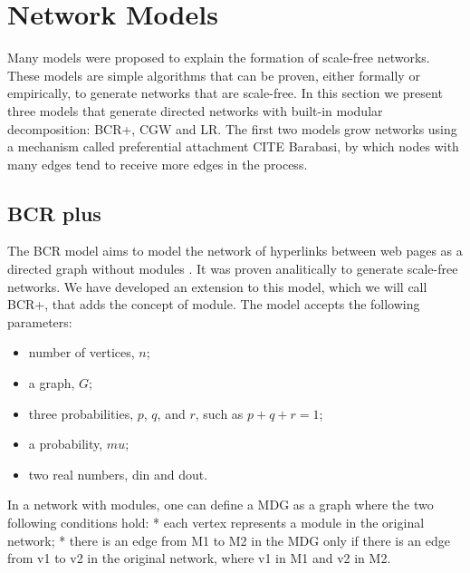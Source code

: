 \section{Network Models}

Many models were proposed to explain the formation of scale-free networks. These
models are simple algorithms that can be proven, either formally or empirically,
to generate networks that are scale-free. In this section we present three
models that generate directed networks with built-in modular decomposition:
BCR+, CGW and LR. The first two models grow networks using a mechanism called
preferential attachment CITE Barabasi, by which nodes with many edges tend to
receive more edges in the process.



\subsection{BCR plus}

The BCR model aims to model the network of hyperlinks between web pages as a
directed graph without modules \cite{Bollobas2003}. It was proven analitically
to generate scale-free networks. We have developed an extension to this model,
which we will call BCR+, that adds the concept of module. The model accepts the
following parameters:

\begin{itemize}
\item number of vertices, $n$;
\item a graph, $G$;
\item three probabilities, $p$, $q$, and $r$, such as $p + q + r = 1$;
\item a probability, $mu$;
\item two real numbers, din and dout.
\end{itemize}

In a network with modules, one can define a MDG as a graph where the two
following conditions hold:
* each vertex represents a module in the original network;
* there is an edge from M1 to M2 in the MDG only if there is an edge from 
v1 to v2 in the original network, where v1 in M1 and v2 in M2.

